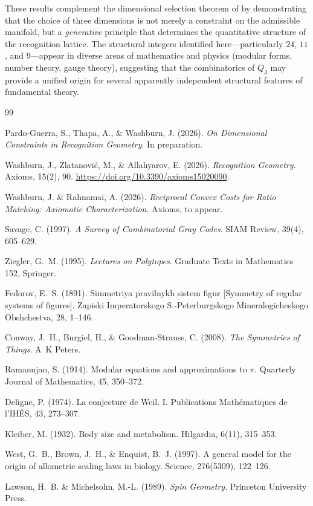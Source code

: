 \documentclass[11pt]{article}
\begin{document}
These results complement the dimensional selection theorem of \cite{PardoGuerraThapa2026} by demonstrating that the choice of three dimensions is not merely a constraint on the admissible manifold, but a \emph{generative} principle that determines the quantitative structure of the recognition lattice.
The structural integers identified here---particularly $24$, $11$, and $9$---appear in diverse areas of mathematics and physics (modular forms, number theory, gauge theory), suggesting that the combinatorics of $Q_3$ may provide a unified origin for several apparently independent structural features of fundamental theory.


\begin{thebibliography}{99}

Pardo-Guerra, S., Thapa, A., \& Washburn, J. (2026).
\textit{On Dimensional Constraints in Recognition Geometry}.
In preparation.

Washburn, J., Zlatanovi\'c, M., \& Allahyarov, E. (2026).
\textit{Recognition Geometry}.
Axioms, 15(2), 90.
\url{https://doi.org/10.3390/axioms15020090}.

Washburn, J. \& Rahnamai, A. (2026).
\textit{Reciprocal Convex Costs for Ratio Matching: Axiomatic Characterization}.
Axioms, to appear.

Savage, C. (1997).
\textit{A Survey of Combinatorial Gray Codes}.
SIAM Review, 39(4), 605--629.

Ziegler, G.~M. (1995).
\textit{Lectures on Polytopes}.
Graduate Texts in Mathematics 152, Springer.

Fedorov, E.~S. (1891).
Simmetriya pravilnykh sistem figur
[Symmetry of regular systems of figures].
Zapiski Imperatorskogo S.-Peterburgskogo Mineralogicheskogo Obshchestva, 28, 1--146.

Conway, J.~H., Burgiel, H., \& Goodman-Strauss, C. (2008).
\textit{The Symmetries of Things}.
A~K Peters.

Ramanujan, S. (1914).
Modular equations and approximations to $\pi$.
Quarterly Journal of Mathematics, 45, 350--372.

Deligne, P. (1974).
La conjecture de Weil. I.
Publications Math\'ematiques de l'IH\'ES, 43, 273--307.

Kleiber, M. (1932).
Body size and metabolism.
Hilgardia, 6(11), 315--353.

West, G.~B., Brown, J.~H., \& Enquist, B.~J. (1997).
A general model for the origin of allometric scaling laws in biology.
Science, 276(5309), 122--126.

Lawson, H.~B. \& Michelsohn, M.-L. (1989).
\textit{Spin Geometry}.
Princeton University Press.

\end{thebibliography}
\end{document}
